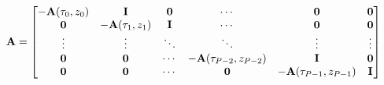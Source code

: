 \[\mathbf{A}=\begin{bmatrix}-\mathbf{A}(\tau_{0},z_{0})&\mathbf{I}&\boldsymbol{{%
0}}&\cdots&\boldsymbol{{0}}&\boldsymbol{{0}}\\
\boldsymbol{{0}}&-\mathbf{A}(\tau_{1},z_{1})&\mathbf{I}&\cdots&\boldsymbol{{0}%
}&\boldsymbol{{0}}\\
\vdots&\vdots&\ddots&\ddots&\vdots&\vdots\\
\boldsymbol{{0}}&\boldsymbol{{0}}&\cdots&-\mathbf{A}(\tau_{P-2},z_{P-2})&%
\mathbf{I}&\boldsymbol{{0}}\\
\boldsymbol{{0}}&\boldsymbol{{0}}&\cdots&\boldsymbol{{0}}&-\mathbf{A}(\tau_{P-%
1},z_{P-1})&\mathbf{I}\end{bmatrix}\]